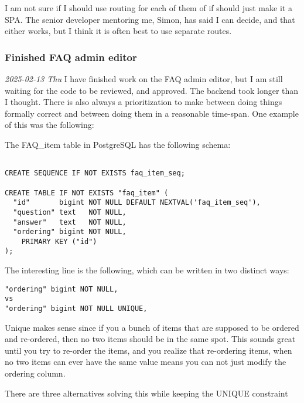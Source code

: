 \documentclass[../main.tex]{subfiles}
\begin{document}
I am not sure if I should use routing for each of them of if should just make it a SPA. The senior developer mentoring me, Simon, has said I can decide, and that either works, but I think it is often best to use separate routes.

\subsubsection{\textbf{Finished FAQ admin editor}}

\textit{2025-02-13 Thu} I have finished work on the FAQ admin editor, but I am still waiting for the code to be reviewed, and approved. The backend took longer than I thought. There is also always a prioritization to make between doing things formally correct and between doing them in a reasonable time-span. One example of this was the following:

The FAQ\_item table in PostgreSQL has the following schema:

\begin{verbatim}
    
CREATE SEQUENCE IF NOT EXISTS faq_item_seq;
  
CREATE TABLE IF NOT EXISTS "faq_item" ( 
  "id"       bigint NOT NULL DEFAULT NEXTVAL('faq_item_seq'),
  "question" text   NOT NULL,
  "answer"   text   NOT NULL,
  "ordering" bigint NOT NULL,
    PRIMARY KEY ("id")
);

\end{verbatim}

The interesting line is the following, which can be written in two distinct ways:

\begin{verbatim}
"ordering" bigint NOT NULL,
vs
"ordering" bigint NOT NULL UNIQUE,
\end{verbatim}

Unique makes sense since if you a bunch of items that are supposed to be ordered and re-ordered, then no two items should be in the same spot. This sounds great until you try to re-order the items, and you realize that re-ordering items, when no two items can ever have the same value means you can not just modify the ordering column.

There are three alternatives solving this while keeping the UNIQUE constraint
\end{document}
